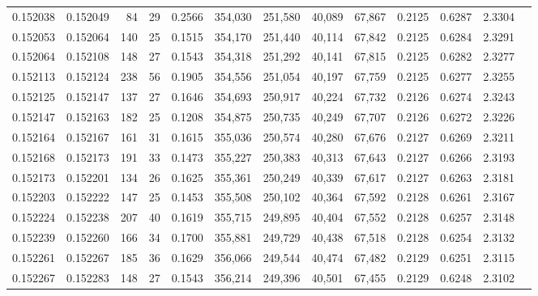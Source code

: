 \begin{tabular}{rrrrrrrrrrrrr}
0.152038 & 0.152049 &    84 &  29 &                                     0.2566 & 354,030 & 251,580 &  40,089 &  67,867 & 0.2125 & 0.6287 & 2.3304 \\
0.152053 & 0.152064 &   140 &  25 &                                     0.1515 & 354,170 & 251,440 &  40,114 &  67,842 & 0.2125 & 0.6284 & 2.3291 \\
0.152064 & 0.152108 &   148 &  27 &                                     0.1543 & 354,318 & 251,292 &  40,141 &  67,815 & 0.2125 & 0.6282 & 2.3277 \\
0.152113 & 0.152124 &   238 &  56 &                                     0.1905 & 354,556 & 251,054 &  40,197 &  67,759 & 0.2125 & 0.6277 & 2.3255 \\
0.152125 & 0.152147 &   137 &  27 &                                     0.1646 & 354,693 & 250,917 &  40,224 &  67,732 & 0.2126 & 0.6274 & 2.3243 \\
0.152147 & 0.152163 &   182 &  25 &                                     0.1208 & 354,875 & 250,735 &  40,249 &  67,707 & 0.2126 & 0.6272 & 2.3226 \\
0.152164 & 0.152167 &   161 &  31 &                                     0.1615 & 355,036 & 250,574 &  40,280 &  67,676 & 0.2127 & 0.6269 & 2.3211 \\
0.152168 & 0.152173 &   191 &  33 &                                     0.1473 & 355,227 & 250,383 &  40,313 &  67,643 & 0.2127 & 0.6266 & 2.3193 \\
0.152173 & 0.152201 &   134 &  26 &                                     0.1625 & 355,361 & 250,249 &  40,339 &  67,617 & 0.2127 & 0.6263 & 2.3181 \\
0.152203 & 0.152222 &   147 &  25 &                                     0.1453 & 355,508 & 250,102 &  40,364 &  67,592 & 0.2128 & 0.6261 & 2.3167 \\
0.152224 & 0.152238 &   207 &  40 &                                     0.1619 & 355,715 & 249,895 &  40,404 &  67,552 & 0.2128 & 0.6257 & 2.3148 \\
0.152239 & 0.152260 &   166 &  34 &                                     0.1700 & 355,881 & 249,729 &  40,438 &  67,518 & 0.2128 & 0.6254 & 2.3132 \\
0.152261 & 0.152267 &   185 &  36 &                                     0.1629 & 356,066 & 249,544 &  40,474 &  67,482 & 0.2129 & 0.6251 & 2.3115 \\
0.152267 & 0.152283 &   148 &  27 &                                     0.1543 & 356,214 & 249,396 &  40,501 &  67,455 & 0.2129 & 0.6248 & 2.3102 \\

\end{tabular}
